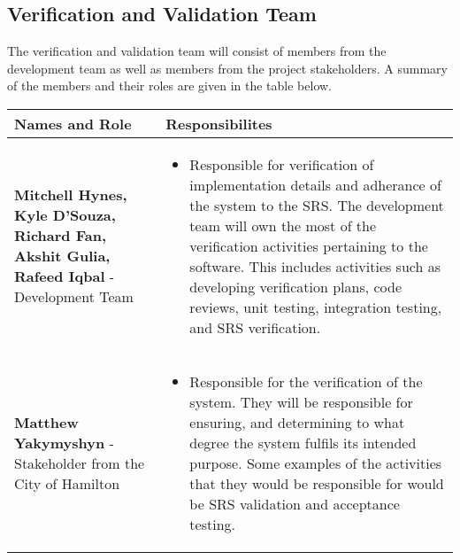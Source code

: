 \documentclass[12pt, titlepage]{article}
\begin{document}
\subsection{Verification and Validation Team}

The verification and validation team will consist of members from the
development team as well as members from the project stakeholders. A summary of
the members and their roles are given in the table below.
\setlength{\arrayrulewidth}{0.5mm}
\setlength{\tabcolsep}{18pt}
\renewcommand{\arraystretch}{1.5}\\
\begin{table}
  \begin{tabular}{ | m{5cm} | m{9cm} | }
    \hline
    \textbf{Names and Role} & \textbf{Responsibilites} \\
    \hline
    \textbf{Mitchell Hynes, Kyle D'Souza, Richard Fan, Akshit Gulia, Rafeed
    Iqbal} - Development Team &
    \begin{itemize}
      \item Responsible for verification of implementation details and
        adherance of the system to the SRS. The development team will own the
        most of the verification activities pertaining to the software. This
        includes activities such as developing verification plans, code reviews,
        unit testing, integration testing, and SRS verification.

    \end{itemize}\\
    \hline
    \textbf{Matthew Yakymyshyn} - Stakeholder from the City of Hamilton &
    \begin{itemize}
      \item Responsible for the verification of the system. They will be
        responsible for ensuring, and determining to what degree the
        system fulfils its intended purpose.
        Some examples of the activities that they would be responsible for
        would be SRS validation and acceptance testing.


\end{itemize}
\end{tabular}
\end{table}
\end{document}
